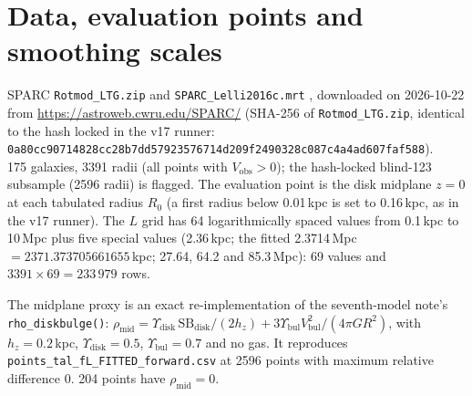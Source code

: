 \documentclass[10pt,a4paper]{article}
\newcommand{\hash}[1]{{\footnotesize\texttt{#1}}}
\begin{document}
\section{Data, evaluation points and smoothing scales}
SPARC \texttt{Rotmod\_LTG.zip} and \texttt{SPARC\_Lelli2016c.mrt} \cite{lelli2016}, downloaded on 2026-10-22 from \url{https://astroweb.cwru.edu/SPARC/} (SHA-256 of \texttt{Rotmod\_LTG.zip}, identical to the hash locked in the v17 runner:\\
\hash{0a80cc90714828cc28b7dd57923576714d209f2490328c087c4a4ad607faf588}).\\
 175 galaxies, 3391 radii (all points with $V_\mathrm{obs}>0$); the hash-locked blind-123 subsample (2596 radii) is flagged. The evaluation point is the disk midplane $z=0$ at each tabulated radius $R_0$ (a first radius below 0.01\,kpc is set to 0.16\,kpc, as in the v17 runner). The $L$ grid has 64 logarithmically spaced values from 0.1\,kpc to 10\,Mpc plus five special values (2.36\,kpc; the fitted 2.3714\,Mpc $=2371.373705661655$\,kpc; 27.64, 64.2 and 85.3\,Mpc): 69 values and $3391\times69=233\,979$ rows.

The midplane proxy is an exact re-implementation of the seventh-model note's \texttt{rho\_diskbulge()}:
$\rho_\mathrm{mid}=\Upsilon_\mathrm{disk}\,\mathrm{SB}_\mathrm{disk}/(2h_z)+3\Upsilon_\mathrm{bul}V_\mathrm{bul}^2/(4\pi G R^2)$, with $h_z=0.2$\,kpc, $\Upsilon_\mathrm{disk}=0.5$, $\Upsilon_\mathrm{bul}=0.7$ and no gas. It reproduces \texttt{points\_tal\_fL\_FITTED\_forward.csv} at 2596 points with maximum relative difference 0. 204 points have $\rho_\mathrm{mid}=0$.
\end{document}

